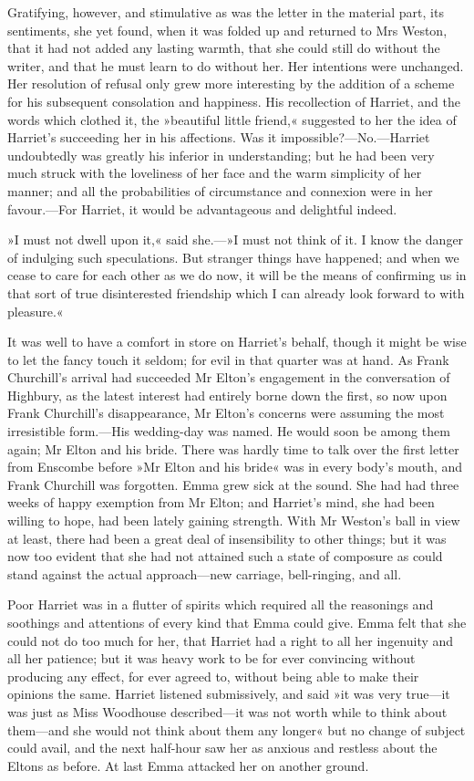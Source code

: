 Gratifying, however, and stimulative as was the letter in the material part, its sentiments, she yet found, when it was folded up and returned to Mrs Weston, that it had not added any lasting warmth, that she could still do without the writer, and that he must learn to do without her. Her intentions were unchanged. Her resolution of refusal only grew more interesting by the addition of a scheme for his subsequent consolation and happiness. His recollection of Harriet, and the words which clothed it, the »beautiful little friend,« suggested to her the idea of Harriet's succeeding her in his affections. Was it impossible?—No.—Harriet undoubtedly was greatly his inferior in understanding; but he had been very much struck with the loveliness of her face and the warm simplicity of her manner; and all the probabilities of circumstance and connexion were in her favour.—For Harriet, it would be advantageous and delightful indeed.

»I must not dwell upon it,« said she.—»I must not think of it. I know the danger of indulging such speculations. But stranger things have happened; and when we cease to care for each other as we do now, it will be the means of confirming us in that sort of true disinterested friendship which I can already look forward to with pleasure.«

It was well to have a comfort in store on Harriet's behalf, though it might be wise to let the fancy touch it seldom; for evil in that quarter was at hand. As Frank Churchill's arrival had succeeded Mr Elton's engagement in the conversation of Highbury, as the latest interest had entirely borne down the first, so now upon Frank Churchill's disappearance, Mr Elton's concerns were assuming the most irresistible form.—His wedding-day was named. He would soon be among them again; Mr Elton and his bride. There was hardly time to talk over the first letter from Enscombe before »Mr Elton and his bride« was in every body's mouth, and Frank Churchill was forgotten. Emma grew sick at the sound. She had had three weeks of happy exemption from Mr Elton; and Harriet's mind, she had been willing to hope, had been lately gaining strength. With Mr Weston's ball in view at least, there had been a great deal of insensibility to other things; but it was now too evident that she had not attained such a state of composure as could stand against the actual approach—new carriage, bell-ringing, and all.

Poor Harriet was in a flutter of spirits which required all the reasonings and soothings and attentions of every kind that Emma could give. Emma felt that she could not do too much for her, that Harriet had a right to all her ingenuity and all her patience; but it was heavy work to be for ever convincing without producing any effect, for ever agreed to, without being able to make their opinions the same. Harriet listened submissively, and said »it was very true—it was just as Miss Woodhouse described—it was not worth while to think about them—and she would not think about them any longer« but no change of subject could avail, and the next half-hour saw her as anxious and restless about the Eltons as before. At last Emma attacked her on another ground.


